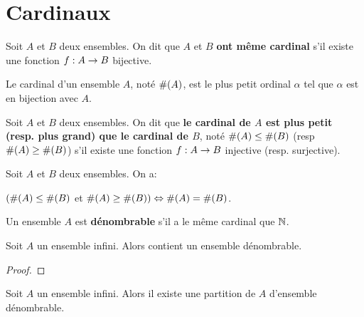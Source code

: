 \chapter{Cardinaux}


\begin{definition}
	Soit $A$ et $B$ deux ensembles.
	On dit que $A$ et $B$ \textbf{ont même cardinal} s'il existe une fonction
	$f : A \rightarrow B$ bijective.
\end{definition}

\begin{definition}
	Le cardinal d'un ensemble $A$, noté $\#(A)$, est le plus petit ordinal
	$\alpha$ tel que $\alpha$ est en bijection avec $A$.
\end{definition}

\begin{definition}
	Soit $A$ et $B$ deux ensembles. On dit que \textbf{le cardinal de $A$ est
	plus petit (resp. plus grand) que le cardinal de $B$}, noté $\#(A) \leq
	\#(B)$ (resp $\#(A) \geq \#(B)$) s'il existe une fonction
	$f : A \rightarrow B$ injective (resp. surjective).
\end{definition}

\begin{theorem} 
	Soit $A$ et $B$ deux ensembles. On a:

	$(\#(A) \leq \#(B)$ et $\#(A) \geq \#(B)) \Leftrightarrow \#(A) =
	\#(B)$.
	\label{thm:csb}
\end{theorem}
\begin{definition}
	Un ensemble $A$ est \textbf{dénombrable} s'il a le même cardinal que
	$\mathbb{N}$.
\end{definition}

\begin{proposition}
	Soit $A$ un ensemble infini. Alors contient un ensemble dénombrable.
\end{proposition}

\ifdefined\outputproof
\begin{proof}

\end{proof}
\fi

\begin{proposition}
	\label{prop:infinite_set_partition}
	Soit $A$ un ensemble infini. Alors il existe une partition de $A$ d'ensemble
	dénombrable.
\end{proposition}

